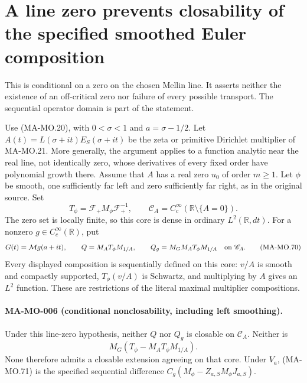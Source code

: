 \section{A line zero prevents closability of the specified smoothed Euler composition}
\label{sec:boundary-euler-nonclosability}

This is conditional on a zero on the chosen Mellin line. It
asserts neither the existence of an off-critical zero nor
failure of every possible transport. The sequential operator
domain is part of the statement.

Use (MA-MO.20), with \(0<\sigma<1\) and \(a=\sigma-1/2\).
Let \(A(t)=L(\sigma+it)E_S(\sigma+it)\) be the zeta or
primitive Dirichlet multiplier of MA-MO.21. More generally,
the argument applies to a function analytic near the real line,
not identically zero, whose derivatives of every fixed order
have polynomial growth there. Assume that \(A\) has a real
zero \(u_0\) of order \(m\ge1\). Let \(\phi\) be smooth,
one sufficiently far left and zero sufficiently far right,
as in the original source. Set
\[
 T_\phi=\mathcal F_+M_\phi\mathcal F_+^{-1},\qquad
 \mathscr C_A=C_c^\infty(\mathbb R\setminus\{A=0\}).
 \tag{MA-MO.69}
\]
The zero set is locally finite, so this core is dense in
ordinary \(L^2(\mathbb R,dt)\). For a nonzero
\(g\in C_c^\infty(\mathbb R)\), put
\[
 G(t)=\mathcal Mg(a+it),\qquad
 Q=M_AT_\phi M_{1/A},\qquad Q_g=M_GM_AT_\phi M_{1/A}
                  \quad\hbox{on }\mathscr C_A.
 \tag{MA-MO.70}
\]
Every displayed composition is sequentially defined on this
core: \(v/A\) is smooth and compactly supported,
\(T_\phi(v/A)\) is Schwartz, and multiplying by \(A\)
gives an \(L^2\) function. These are restrictions of the
literal maximal multiplier compositions.

\paragraph{MA-MO-006 (conditional nonclosability, including left smoothing).}
Under this line-zero hypothesis, neither \(Q\) nor \(Q_g\)
is closable on \(\mathscr C_A\). Neither is
\[
                 M_G(T_\phi-M_AT_\phi M_{1/A}).
 \tag{MA-MO.71}
\]
None therefore admits a closable extension agreeing on that
core. Under \(V_a\), (MA-MO.71) is the specified sequential
difference \(C_g(M_\phi-Z_{a,S}M_\phi J_{a,S})\).

